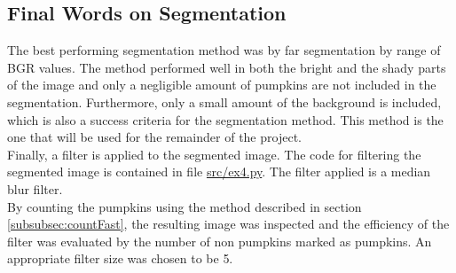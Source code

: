 \documentclass[../Head/Main.tex]{subfiles}
\begin{document}
\subsection{Final Words on Segmentation}
The best performing segmentation method was by far segmentation by range of BGR values. The method performed well in both the bright and the shady parts of the image and only a negligible amount of pumpkins are not included in the segmentation. Furthermore, only a small amount of the background is included, which is also a success criteria for the segmentation method. This method is the one that will be used for the remainder of the project.\\
Finally, a filter is applied to the segmented image. The code for filtering the segmented image is contained in file \url{src/ex4.py}. The filter applied is a median blur filter.\\
By counting the pumpkins using the method described in section \ref{subsubsec:countFast}, the resulting image was inspected and the efficiency of the filter was evaluated by the number of non pumpkins marked as pumpkins. An appropriate filter size was chosen to be 5.
\end{document}
